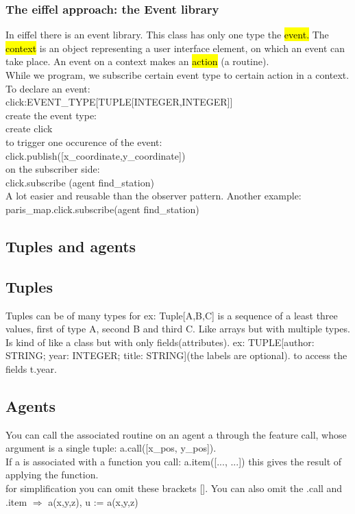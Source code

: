 \documentclass[11pt]{article}
\begin{document}
\subsubsection{The eiffel approach: the Event library}
In eiffel there is an event library. This class has only one type the \hl{event.} The \hl{context} is an object representing a user interface element, on which an event can take place. An event on a context makes an \hl{action} (a routine).\\While we program, we subscribe certain event type to certain action in a context.\\To declare an event:\\
click:EVENT\_TYPE[TUPLE[INTEGER,INTEGER]]\\create the event type:\\create click\\to trigger one occurence of the event:\\click.publish([x\_coordinate,y\_coordinate])\\on the subscriber side:\\click.subscribe (agent find\_station)\\A lot easier and reusable than the observer pattern. Another example:\\paris\_map.click.subscribe(agent find\_station)
\subsection{Tuples and agents}
\subsection{Tuples}
Tuples can be of many types for ex: Tuple[A,B,C] is a sequence of a least three values, first of type A, second B and third C. Like arrays but with multiple types. Is kind of like a class but with only fields(attributes). ex: TUPLE[author: STRING; year: INTEGER; title: STRING](the labels are optional). to access the fields t.year.
\subsection{Agents}
You can call the associated routine on an agent a through the feature call, whose argument is a single tuple: a.call([x\_pos, y\_pos]).\\
If a is associated with a function you call: a.item([..., ...]) this gives the result of applying the function.\\
for simplification you can omit these brackets []. You can also omit the .call and .item $\Rightarrow$ a(x,y,z), u := a(x,y,z) 
\end{document}
